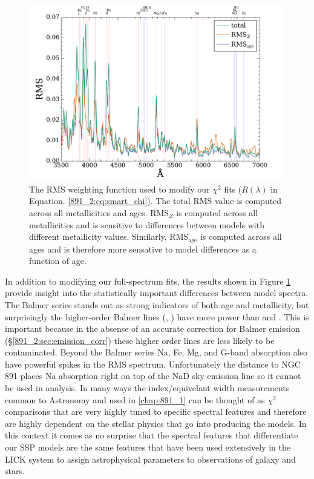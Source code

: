 \begin{figure}
  \centering
  \includegraphics[width=\columnwidth]{891_2/figs/RMS_spec.pdf}
  \caption[RMS-based $\chi^2$ fitting
    weights]{\fixspacing\label{891_2:fig:RMS_spec}The RMS weighting
    function used to modify our $\chi^2$ fits ($R(\lambda)$ in
    Equation. \ref{891_2:eq:smart_chi}). The total RMS value is
    computed across all metallicities and ages. RMS$_Z$ is computed
    across all metallicities and is sensitive to differences between
    models with different metallicity values. Similarly,
    RMS$_\mathrm{age}$ is computed across all ages and is therefore
    more sensative to model differences as a function of age.}
\end{figure}

In addition to modifying our full-spectrum fits, the results shown in
Figure \ref{891_2:fig:RMS_spec} provide insight into the statistically
important differences between model spectra. The Balmer series stands
out as strong indicators of both age and metallicity, but surprisingly
the higher-order Balmer lines (\Hd, \Hg) have more power than \HB and
\Ha. This is important because in the absense of an accurate
correction for Balmer emission (\S\ref{891_2:sec:emission_corr}) these
higher order lines are less likely to be contaminated. Beyond the
Balmer series Na, Fe, Mg, and G-band absorption also have powerful
spikes in the RMS spectrum. Unfortunately the distance to NGC 891
places Na absorption right on top of the NaD sky emission line so it
cannot be used in analysis. In many ways the index/equivelant width
measurements common to Astronomy and used in \ref{chap:891_1}
can be thought of as $\chi^2$ comparisons that are very highly tuned
to specific spectral features and therefore are highly dependent on
the stellar physics that go into producing the models. In this context
it comes as no surprise that the spectral features that differentiate
our SSP models are the same features that have been used extensively
in the LICK system to assign astrophysical parameters to observations
of galaxy and stars.

